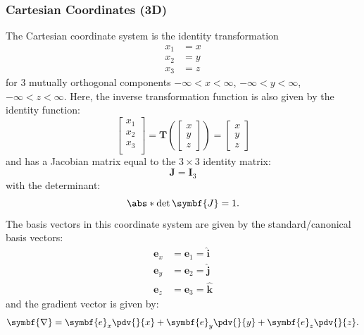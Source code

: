 \documentclass{article}
\begin{document}
\subsubsection{Cartesian Coordinates (3D)}
The Cartesian coordinate system is the identity transformation
\begin{align*}
    x_1 & = x \\
    x_2 & = y \\
    x_3 & = z
\end{align*}
for \(3\) mutually orthogonal components \(-\infty < x < \infty\),
\(-\infty < y < \infty\), \(-\infty < z < \infty\). Here, the inverse
transformation function is also given by the identity function:
\begin{equation*}
    \begin{bmatrix}
        x_1 \\
        x_2 \\
        x_3 \\
    \end{bmatrix}
    = \symbf{T}\left(
    \begin{bmatrix}
            x \\
            y \\
            z
        \end{bmatrix}
    \right) =
    \begin{bmatrix}
        x \\
        y \\
        z
    \end{bmatrix}
\end{equation*}
and has a Jacobian matrix equal to the \(3 \times 3\) identity matrix:
\begin{equation*}
    \symbf{J} = \symbf{I}_3
\end{equation*}
with the determinant:
\begin{equation*}
    \abs*{\det{\symbf{J}}} = 1.
\end{equation*}
The basis vectors in this coordinate system are given by the
standard/canonical basis vectors:
\begin{align*}
    \symbf{e}_x & = \symbf{e}_1 = \hat{\symbf{i}} \\
    \symbf{e}_y & = \symbf{e}_2 = \hat{\symbf{j}} \\
    \symbf{e}_z & = \symbf{e}_3 = \hat{\symbf{k}}
\end{align*}
and the gradient vector is given by:
\begin{equation*}
    \symbf{\nabla} = \symbf{e}_x \pdv{}{x} + \symbf{e}_y \pdv{}{y} + \symbf{e}_z \pdv{}{z}.
\end{equation*}
\end{document}
